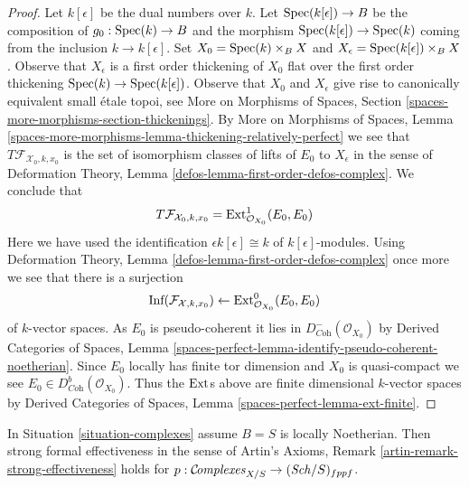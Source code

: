 \begin{proof}
\medskip\noindent
Let $k[\epsilon]$ be the dual numbers over $k$.
Let $\mathop{\mathrm{Spec}}(k[\epsilon]) \to B$ be the composition of $g_0 : \mathop{\mathrm{Spec}}(k) \to B$
and the morphism $\mathop{\mathrm{Spec}}(k[\epsilon]) \to \mathop{\mathrm{Spec}}(k)$
coming from the inclusion $k \to k[\epsilon]$.
Set $X_0 = \mathop{\mathrm{Spec}}(k) \times_B X$ and
$X_\epsilon = \mathop{\mathrm{Spec}}(k[\epsilon]) \times_B X$.
Observe that $X_\epsilon$ is a first order thickening of $X_0$
flat over the first order thickening $\mathop{\mathrm{Spec}}(k) \to \mathop{\mathrm{Spec}}(k[\epsilon])$.
Observe that $X_0$ and $X_\epsilon$ give rise to canonically equivalent
small \'etale topoi, see
More on Morphisms of Spaces, Section
\ref{spaces-more-morphisms-section-thickenings}.
By More on Morphisms of Spaces, Lemma
\ref{spaces-more-morphisms-lemma-thickening-relatively-perfect}
we see that $T\mathcal{F}_{\mathcal{X}_0, k, x_0}$ is the set of
isomorphism classes of lifts of $E_0$ to $X_\epsilon$ in the sense of
Deformation Theory, Lemma \ref{defos-lemma-first-order-defos-complex}.
We conclude that
$$
T\mathcal{F}_{\mathcal{X}_0, k, x_0} =
\mathop{\mathrm{Ext}}\nolimits^1_{\mathcal{O}_{X_0}}(E_0, E_0)
$$
Here we have used the identification $\epsilon k[\epsilon] \cong k$
of $k[\epsilon]$-modules. Using
Deformation Theory, Lemma \ref{defos-lemma-first-order-defos-complex}
once more we see that there is a surjection
$$
\text{Inf}(\mathcal{F}_{\mathcal{X}, k, x_0})
\leftarrow
\mathop{\mathrm{Ext}}\nolimits^0_{\mathcal{O}_{X_0}}(E_0, E_0)
$$
of $k$-vector spaces. As $E_0$ is pseudo-coherent it lies in
$D^-_{\textit{Coh}}(\mathcal{O}_{X_0})$ by
Derived Categories of Spaces, Lemma
\ref{spaces-perfect-lemma-identify-pseudo-coherent-noetherian}.
Since $E_0$ locally has finite tor dimension and $X_0$
is quasi-compact we see $E_0 \in D^b_{\textit{Coh}}(\mathcal{O}_{X_0})$.
Thus the $\mathop{\mathrm{Ext}}\nolimits$s above are finite dimensional $k$-vector spaces
by Derived Categories of Spaces, Lemma
\ref{spaces-perfect-lemma-ext-finite}.
\end{proof}

\begin{lemma}
\label{lemma-complexes-strong-effectiveness}
In Situation \ref{situation-complexes} assume $B = S$ is locally Noetherian.
Then strong formal effectiveness in the sense of
Artin's Axioms, Remark \ref{artin-remark-strong-effectiveness}
holds for $p : \mathcal{C}\!\mathit{omplexes}_{X/S} \to (\mathit{Sch}/S)_{fppf}$.
\end{lemma}

